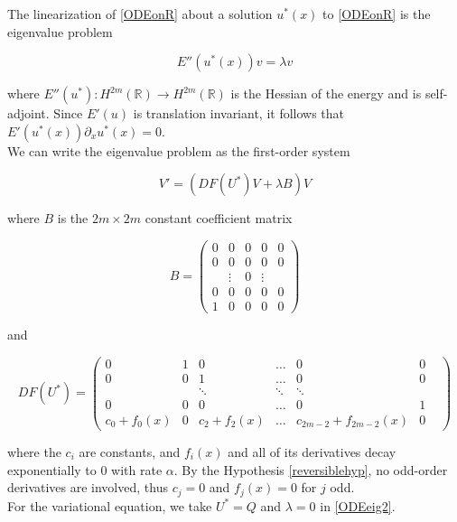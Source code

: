 \documentclass[12pt]{article}
\def\R{{\mathbb R}}
\begin{document}
The linearization of \eqref{ODEonR} about a solution $u^*(x)$ to \eqref{ODEonR} is the eigenvalue problem

\begin{equation}\label{ODEeig}
E''(u^*(x)) v = \lambda v
\end{equation}

where $E''(u^*): H^{2m}(\R) \rightarrow H^{2m}(\R)$ is the Hessian of the energy and is self-adjoint. Since $E'(u)$ is translation invariant, it follows that $E'(u^*(x)) \partial_x u^*(x) = 0$.\\

We can write the eigenvalue problem as the first-order system

\begin{equation}\label{ODEeig2}
V' = ( DF(U^*)V + \lambda B)V 
\end{equation}

where $B$ is the $2m \times 2m$ constant coefficient matrix

\begin{equation}
B = \begin{pmatrix}0 & 0 & 0 & 0 & 0 \\0 & 0 & 0 & 0 & 0 \\  & 
\vdots & 0 & \vdots & \\0 & 0 & 0 & 0 & 0 \\1 & 0 & 0 & 0 & 0 \end{pmatrix} 
\end{equation}

and 

\begin{equation}
DF(U^*) = \begin{pmatrix}
0 & 1 & 0 & \dots & 0 & 0 \\
0 & 0 & 1 & \dots & 0 & 0 \\
& & \ddots & \ddots & \ddots & & \\
0 & 0 & 0 & \dots & 0 & 1 \\
c_0 + f_0(x) & 0 & c_2 + f_2(x) &
 \dots & c_{2m-2} + f_{2m-2}(x) & 0
\end{pmatrix}
\end{equation}

where the $c_i$ are constants, and $f_i(x)$ and all of its derivatives decay exponentially to 0 with rate $\alpha$. By the Hypothesis \ref{reversiblehyp}, no odd-order derivatives are involved, thus $c_j = 0$ and $f_j(x) = 0$ for $j$ odd.\\

For the variational equation, we take $U^* = Q$ and $\lambda = 0$ in \eqref{ODEeig2}.
\end{document}
